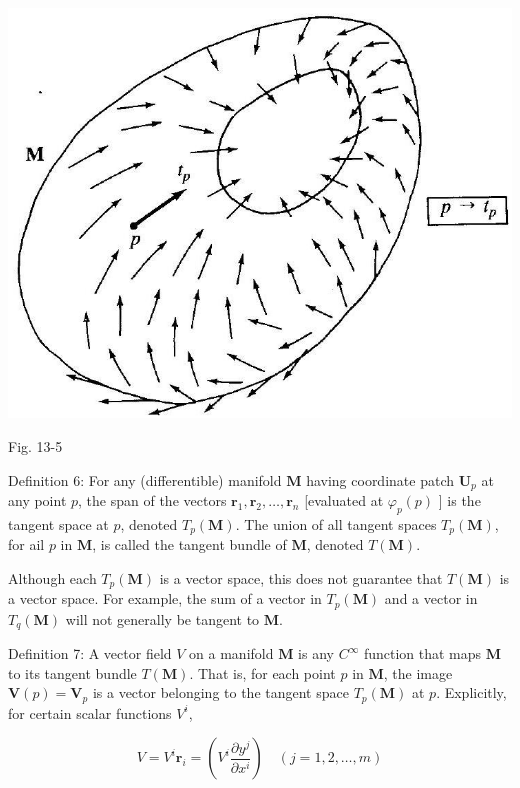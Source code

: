 \documentclass[10pt]{article}
\begin{document}
\begin{center}
\includegraphics[max width=\textwidth]{2024_04_03_41f90be4f896e21f0dc9g-207}
\end{center}

Fig. 13-5

Definition 6: For any (differentible) manifold $\mathbf{M}$ having coordinate patch $\mathbf{U}_{p}$ at any point $p$, the span of the vectors $\mathbf{r}_{1}, \mathbf{r}_{2}, \ldots, \mathbf{r}_{n}$ [evaluated at $\varphi_{p}(p)$ ] is the tangent space at $p$, denoted $T_{p}(\mathbf{M})$. The union of all tangent spaces $T_{p}(\mathbf{M})$, for ail $p$ in $\mathbf{M}$, is called the tangent bundle of $\mathbf{M}$, denoted $T(\mathbf{M})$.

Although each $T_{p}(\mathbf{M})$ is a vector space, this does not guarantee that $T(\mathbf{M})$ is a vector space. For example, the sum of a vector in $T_{p}(\mathbf{M})$ and a vector in $T_{q}(\mathbf{M})$ will not generally be tangent to $\mathbf{M}$.

Definition 7: A vector field $V$ on a manifold $\mathbf{M}$ is any $C^{\infty}$ function that maps $\mathbf{M}$ to its tangent bundle $T(\mathbf{M})$. That is, for each point $p$ in $\mathbf{M}$, the image $\mathbf{V}(p)=\mathbf{V}_{p}$ is a vector belonging to the tangent space $T_{p}(\mathbf{M})$ at $p$. Explicitly, for certain scalar functions $V^{i}$,


\begin{equation*}
V=V^{i} \mathbf{r}_{i}=\left(V^{i} \frac{\partial y^{j}}{\partial x^{i}}\right) \quad(j=1,2, \ldots, m) \tag{13.7a}
\end{equation*}
\end{document}
